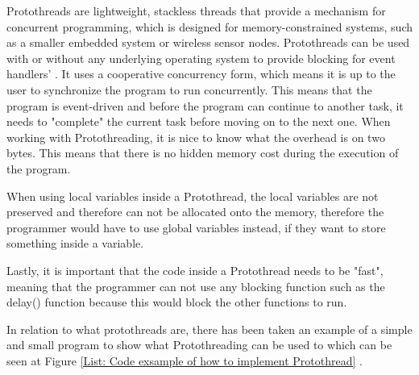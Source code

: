 Protothreads are lightweight, stackless threads that provide a mechanism for concurrent programming, which is designed for memory-constrained systems, such as a smaller embedded system or wireless sensor nodes. Protothreads can be used with or without any underlying operating system to provide blocking for event handlers'
\cite{AdamDunkelProtothreads}. It uses a cooperative concurrency form, which means it is up to the user to synchronize the program to run concurrently. This means that the program is event-driven and before the program can continue to another task, it needs to "complete" the current task before moving on to the next one.
When working with Protothreading, it is nice to know what the overhead is on two bytes. This means that there is no hidden memory cost during the execution of the program. 

When using local variables inside a Protothread, the local variables are not preserved and therefore can not be allocated onto the memory, therefore the programmer would have to use global variables instead, if they want to store something inside a variable.

Lastly, it is important that the code inside a Protothread needs to be "fast", meaning that the programmer can not use any blocking function such as the delay() function because this would block the other functions to run. \cite{AdamDunkelProtothreads}

In relation to what protothreads are, there has been taken an example of a simple and small program to show what Protothreading can be used to which can be seen at Figure \ref{List: Code exsample of how to implement Protothread} \cite{ArduinoProtothreadsTutorial2019}.

